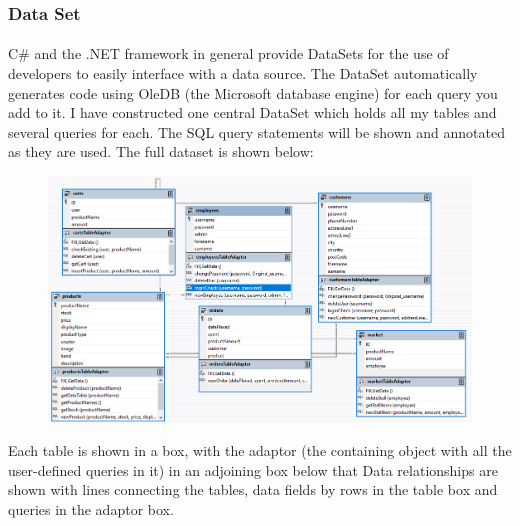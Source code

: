 ﻿\documentclass{article}
\begin{document}
    \subsubsection{Data Set}
    \paragraph{}
    C\# and the .NET framework in general provide DataSets for the use of developers to easily interface with a data source.
    The DataSet automatically generates code using OleDB (the Microsoft database engine) for each query you add to it.
    I have constructed one central DataSet which holds all my tables and several queries for each.
    The SQL query statements will be shown and annotated as they are used.
    The full dataset is shown below:
    \begin{figure}[H]
        \centering
        \includegraphics[width=\textwidth]{defaultDataSet.png}
    \end{figure}
    Each table is shown in a box, with the adaptor (the containing object with all the user-defined queries in it) in an adjoining box below that
    Data relationships are shown with lines connecting the tables, data fields by rows in the table box and queries in the adaptor box.
    \newpage
\end{document}
